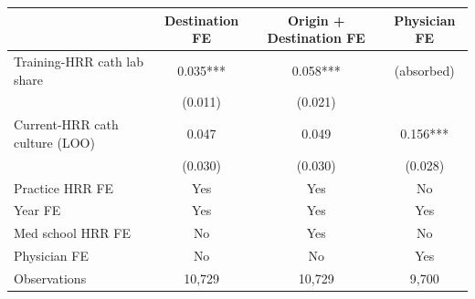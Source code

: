 
\begin{tabular}{lccc}
\toprule
 & Destination FE & Origin + Destination FE & Physician FE\\
\midrule
Training-HRR cath lab share & 0.035*** & 0.058*** & (absorbed)\\
 & (0.011) & (0.021) & \\
Current-HRR cath culture (LOO) & 0.047 & 0.049 & 0.156***\\
 & (0.030) & (0.030) & (0.028)\\
\midrule
Practice HRR FE & Yes & Yes & No\\
Year FE & Yes & Yes & Yes\\
Med school HRR FE & No & Yes & No\\
Physician FE & No & No & Yes\\
Observations & 10,729 & 10,729 & 9,700\\
\bottomrule
\end{tabular}
